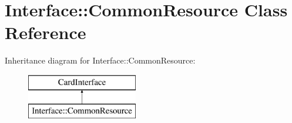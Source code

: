 \hypertarget{class_interface_1_1_common_resource}{\section{Interface\-:\-:Common\-Resource Class Reference}
\label{class_interface_1_1_common_resource}
}
Inheritance diagram for Interface\-:\-:Common\-Resource\-:\begin{figure}[H]
\begin{center}
\leavevmode
\includegraphics[height=2.000000cm]{class_interface_1_1_common_resource}
\end{center}
\end{figure}

